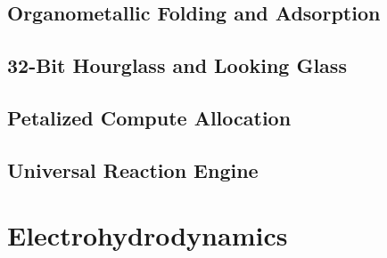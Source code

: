 \documentclass[11pt, letterpaper, oneside]{report}
\begin{document}


\chapter{Organometallic Folding and Adsorption}
\label{ch:orgmet}


\chapter{32-Bit Hourglass and Looking Glass}
\label{ch:hourglass}


\chapter{Petalized Compute Allocation}
\label{ch:petalized}


\chapter{Universal Reaction Engine}
\label{ch:rxnengine}



\part{Electrohydrodynamics}
\label{part:ehd}
\end{document}
